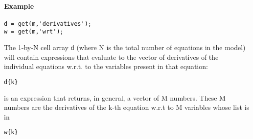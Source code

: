 \paragraph{Example}\label{example}

\begin{verbatim}
d = get(m,'derivatives');
w = get(m,'wrt');
\end{verbatim}

The 1-by-N cell array \texttt{d} (where N is the total number of
equations in the model) will contain expressions that evaluate to the
vector of derivatives of the individual equations w.r.t. to the
variables present in that equation:

\begin{verbatim}
d{k}
\end{verbatim}

is an expression that returns, in general, a vector of M numbers. These
M numbers are the derivatives of the k-th equation w.r.t to M variables
whose list is in

\begin{verbatim}
w{k}
\end{verbatim}


